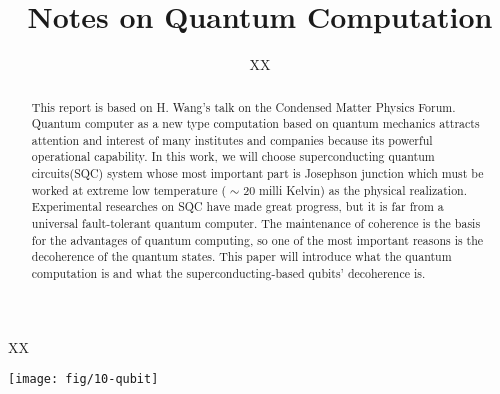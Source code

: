 \documentclass[]{nature}
\title{Notes on Quantum Computation}
\author{XX}
\makeatletter
\renewenvironment{figure}
{\@float{figure}}
{\end@float}
\makeatother
\begin{document}
\maketitle

\begin{affiliations}
 \item XX
\end{affiliations}

\begin{abstract}
This report is based on H. Wang's talk on the Condensed Matter Physics Forum. Quantum computer as a new type computation based on quantum mechanics attracts attention and interest of many institutes and companies because its powerful operational capability. In this work, we will choose superconducting quantum circuits(SQC) system whose most important part is Josephson junction which must be worked at extreme low temperature ( $\sim$ 20 milli Kelvin) as the physical realization. Experimental researches on SQC have made great progress, but it is far from a universal fault-tolerant quantum computer. The maintenance of coherence is the basis for the advantages of quantum computing, so one of the most important reasons is the decoherence of the quantum states. This paper will introduce what the quantum computation is and what the superconducting-based qubits' decoherence is.
\end{abstract}




\begin{figure}
\centering
\texttt{[image: fig/10-qubit]}
\caption{ The 10-qubit superconducting sample\cite{Song2017}} \label{10_qubit}
\end{figure}

\end{document}
